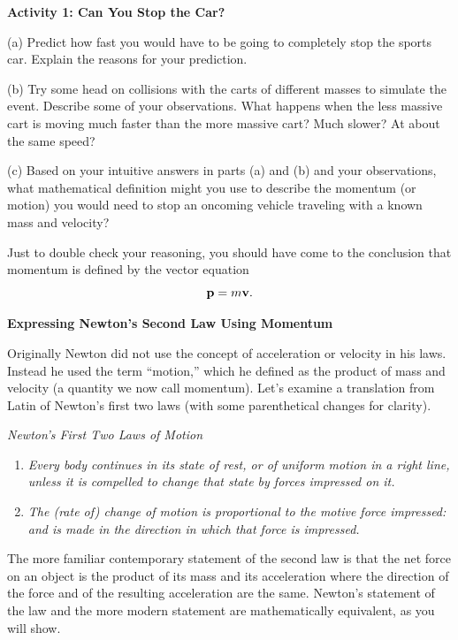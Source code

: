\textbf{Activity 1: Can You Stop the Car?} 

(a) Predict how fast you would have to be going to completely stop the sports
car. Explain the reasons for your prediction.
\vspace{20mm}

(b) Try some head on collisions with the carts of different masses to simulate
the event. Describe some of your observations. What happens when the less massive
cart is moving much faster than the more massive cart? Much slower? At about
the same speed?
\vspace{20mm}

(c) Based on your intuitive answers in parts (a) and (b) and your observations,
what mathematical definition might you use to describe the momentum (or motion)
you would need to stop an oncoming vehicle traveling with a known mass and velocity?
\vspace{20mm}

Just to double check your reasoning, you should have come to the conclusion
that momentum is defined by the vector equation
\[
{\bf p}=m{\bf v}.\]


\textbf{Expressing Newton's Second Law Using Momentum }

Originally Newton did not use the concept of acceleration or velocity in his
laws. Instead he used the term ``motion,'' which he defined
as the product of mass and velocity (a quantity we now call momentum). Let's
examine a translation from Latin of Newton's first two laws (with some parenthetical
changes for clarity).

\textit{Newton's First Two Laws of Motion}

\begin{enumerate}
\item \textit{Every body continues in its state of rest, or of uniform motion in a
right line, unless it is compelled to change that state by forces impressed
on it. }
\item \textit{The (rate of) change of motion is proportional to the motive force impressed:
and is made in the direction in which that force is impressed.}
\end{enumerate}
The more familiar contemporary statement of the second law is that the net force
on an object is the product of its mass and its acceleration where the direction
of the force and of the resulting acceleration are the same. Newton's statement
of the law and the more modern statement are mathematically equivalent, as you
will show.

